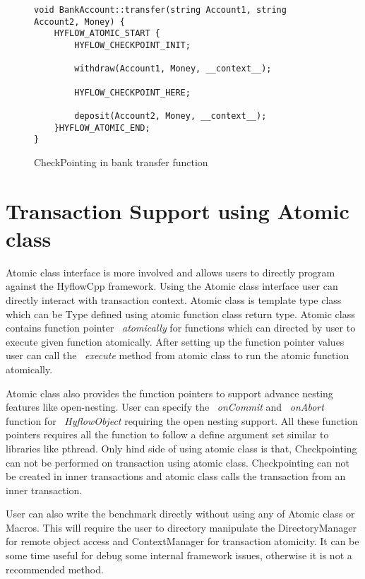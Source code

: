 \documentclass[12pt,english]{report}
\begin{document}
\begin{figure}
\begin{minipage}[b]{0.9\linewidth}\centering
\begin{lstlisting}
void BankAccount::transfer(string Account1, string Account2, Money) {
	HYFLOW_ATOMIC_START {
		HYFLOW_CHECKPOINT_INIT;

		withdraw(Account1, Money, __context__);

		HYFLOW_CHECKPOINT_HERE;
	
		deposit(Account2, Money, __context__);
	}HYFLOW_ATOMIC_END;
}
\end{lstlisting}
\end{minipage}
\caption{CheckPointing in bank transfer function}
\label{Fig:bankCP}
\end{figure}

\section{Transaction Support using Atomic class}

Atomic class interface is more involved and allows users to directly program against the HyflowCpp framework. Using the Atomic class interface user can directly interact with transaction context. Atomic class is template type class which can be Type defined using atomic function class return type. Atomic class contains function pointer ~\emph{atomically} for functions which can directed by user to execute given function atomically. After setting up the function pointer values user can call the ~\emph{execute} method from atomic class to run the atomic function atomically.

Atomic class also provides the function pointers to support advance nesting features like open-nesting. User can specify the ~\emph{onCommit} and ~\emph{onAbort} function for  ~\emph{HyflowObject} requiring the open nesting support. All these function pointers requires all the function to follow a define argument set similar to libraries like pthread. Only hind side of using atomic class is that, Checkpointing can not be performed on transaction using atomic class. Checkpointing can not be created in inner transactions and atomic class calls the transaction from an inner transaction. 

User can also write the benchmark directly without using any of Atomic class or Macros. This will require the user to directory manipulate the DirectoryManager for remote object access and ContextManager for transaction atomicity. It can be some time useful for debug some internal framework issues, otherwise it is not a recommended method.
\end{document}
